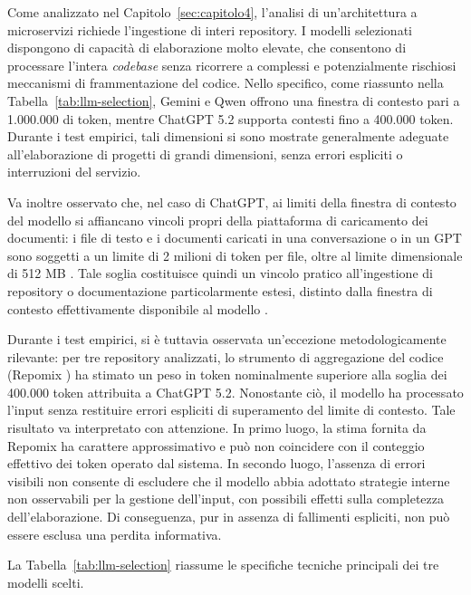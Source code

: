 Come analizzato nel Capitolo~\ref{sec:capitolo4}, l'analisi di un'architettura a microservizi richiede l'ingestione di interi repository. I modelli selezionati dispongono di capacità di elaborazione molto elevate, che consentono di processare l'intera \textit{codebase} senza ricorrere a complessi e potenzialmente rischiosi meccanismi di frammentazione del codice. Nello specifico, come riassunto nella Tabella~\ref{tab:llm-selection}, Gemini e Qwen offrono una finestra di contesto pari a 1.000.000 di token, mentre ChatGPT 5.2 supporta contesti fino a 400.000 token. Durante i test empirici, tali dimensioni si sono mostrate generalmente adeguate all'elaborazione di progetti di grandi dimensioni, senza errori espliciti o interruzioni del servizio.

Va inoltre osservato che, nel caso di ChatGPT, ai limiti della finestra di contesto del modello si affiancano vincoli propri della piattaforma di caricamento dei documenti: i file di testo e i documenti caricati in una conversazione o in un GPT sono soggetti a un limite di 2 milioni di token per file, oltre al limite dimensionale di 512 MB \cite{openai_file_uploads_faq}. Tale soglia costituisce quindi un vincolo pratico all'ingestione di repository o documentazione particolarmente estesi, distinto dalla finestra di contesto effettivamente disponibile al modello \cite{openai_file_uploads_faq}.

Durante i test empirici, si è tuttavia osservata un'eccezione metodologicamente rilevante: per tre repository analizzati, lo strumento di aggregazione del codice (Repomix \cite{repomix2026}) ha stimato un peso in token nominalmente superiore alla soglia dei 400.000 token attribuita a ChatGPT 5.2. Nonostante ciò, il modello ha processato l'input senza restituire errori espliciti di superamento del limite di contesto. Tale risultato va interpretato con attenzione. In primo luogo, la stima fornita da Repomix ha carattere approssimativo e può non coincidere con il conteggio effettivo dei token operato dal sistema. In secondo luogo, l'assenza di errori visibili non consente di escludere che il modello abbia adottato strategie interne non osservabili per la gestione dell'input, con possibili effetti sulla completezza dell'elaborazione. Di conseguenza, pur in assenza di fallimenti espliciti, non può essere esclusa una perdita informativa.

La Tabella~\ref{tab:llm-selection} riassume le specifiche tecniche principali dei tre modelli scelti.

